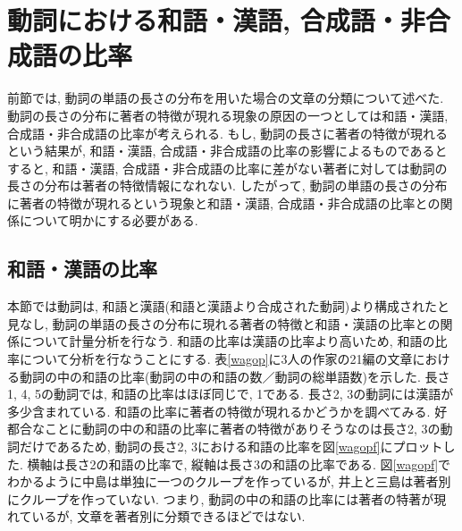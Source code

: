\section{動詞における和語・漢語, 合成語・非合成語の比率}
前節では, 動詞の単語の長さの分布を用いた場合の文章の分類について述べた. 動詞の長さの分布に著者の特徴が現れる現象の原因の一つとしては和語・漢語, 合成語・非合成語の比率が考えられる.  
もし, 動詞の長さに著者の特徴が現れるという結果が, 和語・漢語, 合成語・非合成語の比率の影響によるものであるとすると, 和語・漢語, 合成語・非合成語の比率に差がない著者に対しては動詞の長さの分布は著者の特徴情報になれない.
したがって, 動詞の単語の長さの分布に著者の特徴が現れるという現象と和語・漢語, 合成語・非合成語の比率との関係について明かにする必要がある. 

\subsection{和語・漢語の比率}
本節では動詞は, 和語と漢語(和語と漢語より合成された動詞)より構成されたと見なし, 動詞の単語の長さの分布に現れる著者の特徴と和語・漢語の比率との関係について計量分析を行なう.
 和語の比率は漢語の比率より高いため, 和語の比率について分析を行なうことにする. 表\ref{wagop}に3人の作家の21編の文章における動詞の中の和語の比率(動詞の中の和語の数／動詞の総単語数)を示した. 長さ1, 4, 5の動詞では, 和語の比率はほぼ同じで, 1である. 長さ2, 3の動詞には漢語が多少含まれている. 和語の比率に著者の特徴が現れるかどうかを調べてみる. 好都合なことに動詞の中の和語の比率に著者の特徴がありそうなのは長さ2, 3の動詞だけであるため,  動詞の長さ2, 3における和語の比率を図\ref{wagopf}にプロットした. 横軸は長さ2の和語の比率で, 縦軸は長さ3の和語の比率である. 図\ref{wagopf}でわかるように中島は単独に一つのクループを作っているが, 井上と三島は著者別にクループを作っていない. つまり, 動詞の中の和語の比率には著者の特著が現れているが, 文章を著者別に分類できるほどではない. 
